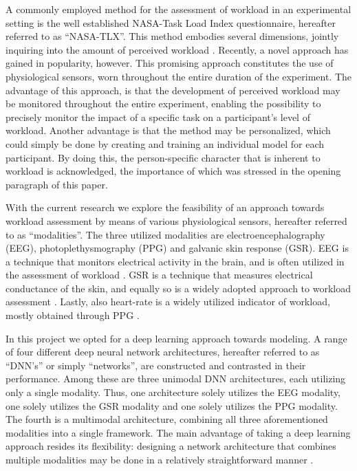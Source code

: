 \documentclass[fleqn,11pt]{paper}
\begin{document}
A commonly employed method for the assessment of workload in an experimental setting is the well established NASA-Task Load Index questionnaire, hereafter referred to as \enquote{NASA-TLX}. This method embodies several dimensions, jointly inquiring into the amount of perceived workload \cite{hart2006nasa}. Recently, a novel approach has gained in popularity, however. This promising approach constitutes the use of physiological sensors, worn throughout the entire duration of the experiment. The advantage of this approach, is that the development of perceived workload may be monitored throughout the entire experiment, enabling the possibility to precisely monitor the impact of a specific task on a participant's level of workload. Another advantage is that the method may be personalized, which could simply be done by creating and training an individual model for each participant. By doing this, the person-specific character that is inherent to workload is acknowledged, the importance of which was stressed in the opening paragraph of this paper. 

With the current research we explore the feasibility of an approach towards workload assessment by means of various physiological sensors, hereafter referred to as \enquote{modalities}. The three utilized modalities are electroencephalography (EEG), photoplethysmography (PPG) and galvanic skin response (GSR). EEG is a technique that monitors electrical activity in the brain, and is often utilized in the assessment of workload \cite{berka2005evaluation, craik2019deep, hogervorst2014combining}. GSR is a technique that measures electrical conductance of the skin, and equally so is a widely adopted approach to workload assessment \cite{nourbakhsh2012using, zhou2015dynamic}. Lastly, also heart-rate is a widely utilized indicator of workload, mostly obtained through PPG \cite{zhang2018evaluating,jimenez2018using}. 

In this project we opted for a deep learning approach towards modeling. A range of four different deep neural network architectures, hereafter referred to as \enquote{DNN's} or simply \enquote{networks},  are constructed and contrasted in their performance. Among these are three unimodal DNN architectures, each utilizing only a single modality. Thus,  one architecture solely utilizes the EEG modality,  one solely utilizes the GSR modality and one solely utilizes the PPG modality. The fourth is a multimodal architecture, combining all three aforementioned modalities into a single framework. The main advantage of taking a deep learning approach resides its flexibility: designing a network architecture that combines multiple modalities may be done in a relatively straightforward manner \cite{ramachandram2017deep}. 
\end{document}
